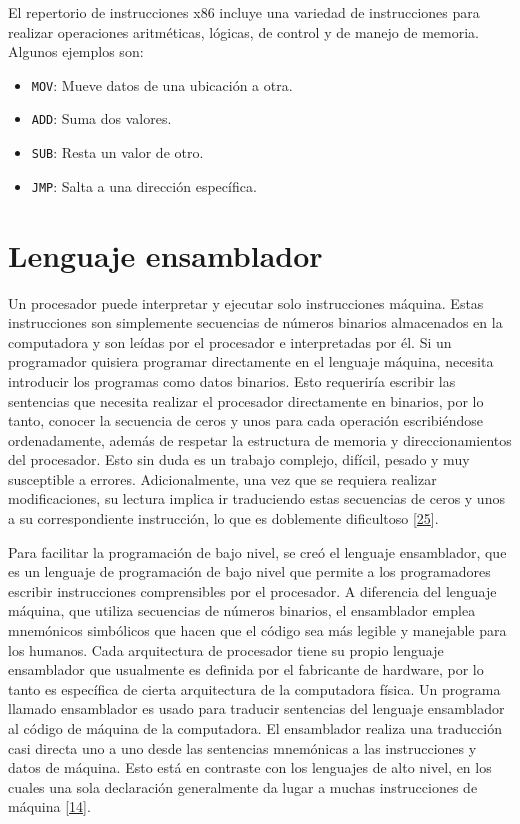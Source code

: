 \documentclass[12pt,twoside]{templates/unerthesis}
\providecommand{\tightlist}{%
  \setlength{\itemsep}{0pt}\setlength{\parskip}{0pt}}
\begin{document}
El repertorio de instrucciones x86 incluye una variedad de instrucciones para realizar operaciones aritméticas, lógicas, de control y de manejo de memoria. Algunos ejemplos son:

\begin{itemize}
\tightlist
\item
  \texttt{MOV}: Mueve datos de una ubicación a otra.
\item
  \texttt{ADD}: Suma dos valores.
\item
  \texttt{SUB}: Resta un valor de otro.
\item
  \texttt{JMP}: Salta a una dirección específica.
\end{itemize}

\hypertarget{lenguaje-ensamblador}{%
\section{Lenguaje ensamblador}\label{lenguaje-ensamblador}}

Un procesador puede interpretar y ejecutar solo instrucciones máquina. Estas instrucciones son simplemente secuencias de números binarios almacenados en la computadora y son leídas por el procesador e interpretadas por él. Si un programador quisiera programar directamente en el lenguaje máquina, necesita introducir los programas como datos binarios. Esto requeriría escribir las sentencias que necesita realizar el procesador directamente en binarios, por lo tanto, conocer la secuencia de ceros y unos para cada operación escribiéndose ordenadamente, además de respetar la estructura de memoria y direccionamientos del procesador. Esto sin duda es un trabajo complejo, difícil, pesado y muy susceptible a errores. Adicionalmente, una vez que se requiera realizar modificaciones, su lectura implica ir traduciendo estas secuencias de ceros y unos a su correspondiente instrucción, lo que es doblemente dificultoso {[}\protect\hyperlink{ref-irvine2011assembly}{25}{]}.

Para facilitar la programación de bajo nivel, se creó el lenguaje ensamblador, que es un lenguaje de programación de bajo nivel que permite a los programadores escribir instrucciones comprensibles por el procesador. A diferencia del lenguaje máquina, que utiliza secuencias de números binarios, el ensamblador emplea mnemónicos simbólicos que hacen que el código sea más legible y manejable para los humanos. Cada arquitectura de procesador tiene su propio lenguaje ensamblador que usualmente es definida por el fabricante de hardware, por lo tanto es específica de cierta arquitectura de la computadora física. Un programa llamado ensamblador es usado para traducir sentencias del lenguaje ensamblador al código de máquina de la computadora. El ensamblador realiza una traducción casi directa uno a uno desde las sentencias mnemónicas a las instrucciones y datos de máquina. Esto está en contraste con los lenguajes de alto nivel, en los cuales una sola declaración generalmente da lugar a muchas instrucciones de máquina {[}\protect\hyperlink{ref-stallings_computer_2013}{14}{]}.
\end{document}
